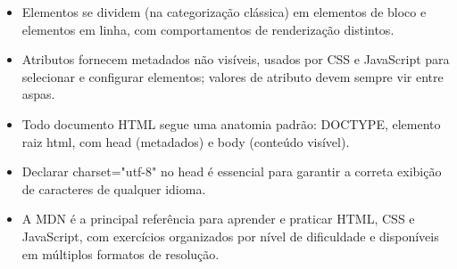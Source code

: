 \begin{itemize}
  \item Elementos se dividem (na categorização clássica) em elementos de bloco e elementos em linha, com comportamentos de renderização distintos.
\end{itemize}

\begin{itemize}
  \item Atributos fornecem metadados não visíveis, usados por CSS e JavaScript para selecionar e configurar elementos; valores de atributo devem sempre vir entre aspas.
\end{itemize}

\begin{itemize}
  \item Todo documento HTML segue uma anatomia padrão: DOCTYPE, elemento raiz html, com head (metadados) e body (conteúdo visível).
\end{itemize}

\begin{itemize}
  \item Declarar charset="utf-8" no head é essencial para garantir a correta exibição de caracteres de qualquer idioma.
\end{itemize}

\begin{itemize}
  \item A MDN é a principal referência para aprender e praticar HTML, CSS e JavaScript, com exercícios organizados por nível de dificuldade e disponíveis em múltiplos formatos de resolução.
\end{itemize}
